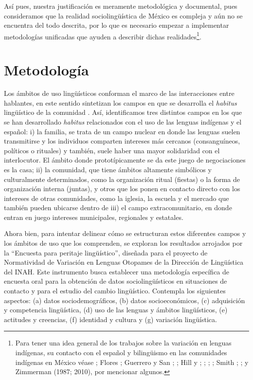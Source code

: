 \documentclass[output=paper]{../langscibook}
\begin{document}
Así pues, nuestra justificación es meramente metodológica y documental, pues consideramos que la realidad sociolingüística de México es compleja y aún no se encuentra del todo descrita, por lo que es necesario empezar a implementar metodologías unificadas que ayuden a describir dichas realidades\footnote{Para tener una idea general de los trabajos sobre la variación en lenguas indígenas, su contacto con el español y bilingüismo en las comunidades indígenas en México véase \citet{Cifuentes1998}; Flores \citet{Farfán1998}; Guerrero y San \citet{Giacomo2014}; \citet{Hekking1995}; Hill y \citet{Hill1986}; \citet{Levy1990}; \citet{Lastra2003}; \citet{Pfeiler1988}; Smith \citet{Stark2007}; \citet{Suárez1977}; \citet{Villavicencio2006} y Zimmerman (1987; 2010), por mencionar algunos.}.


 \section{Metodología}


Los ámbitos de uso lingüísticos conforman el marco de las interacciones entre hablantes, en este sentido sintetizan los campos en que se desarrolla el \textit{habitus} lingüístico de la comunidad \citep[109]{Bourdieu1990}. Así, identificamos tres distintos campos en los que se han desarrollado \textit{habitus} relacionados con el uso de las lenguas indígenas y el español: i) la familia, se trata de un campo nuclear en donde las lenguas suelen transmitirse y los individuos comparten intereses más cercanos (consanguíneos, políticos o rituales) y también, suele haber una mayor solidaridad con el interlocutor. El ámbito donde prototípicamente se da este juego de negociaciones es la casa; ii) la comunidad, que tiene ámbitos altamente simbólicos y culturalmente determinados, como la organización ritual (fiestas) o la forma de organización interna (juntas), y otros que los ponen en contacto directo con los intereses de otras comunidades, como la iglesia, la escuela y el mercado que también pueden ubicarse dentro de iii) el campo extracomunitario, en donde entran en juego intereses municipales, regionales y estatales.

  Ahora bien, para intentar delinear cómo se estructuran estos diferentes campos y los ámbitos de uso que los comprenden, se exploran los resultados arrojados por la “Encuesta para peritaje lingüístico”, diseñada para el proyecto de Normatividad de Variación en Lenguas Otopames de la Dirección de Lingüística del INAH. Este instrumento busca establecer una metodología específica de encuesta oral para la obtención de datos sociolingüísticos en situaciones de contacto y para el estudio del cambio lingüístico. Contempla los siguientes aspectos: (a) datos sociodemográficos, (b) datos socioeconómicos, (c) adquisición y competencia lingüística, (d) uso de las lenguas y ámbitos lingüísticos, (e) actitudes y creencias, (f) identidad y cultura y (g) variación lingüística.
\end{document}
